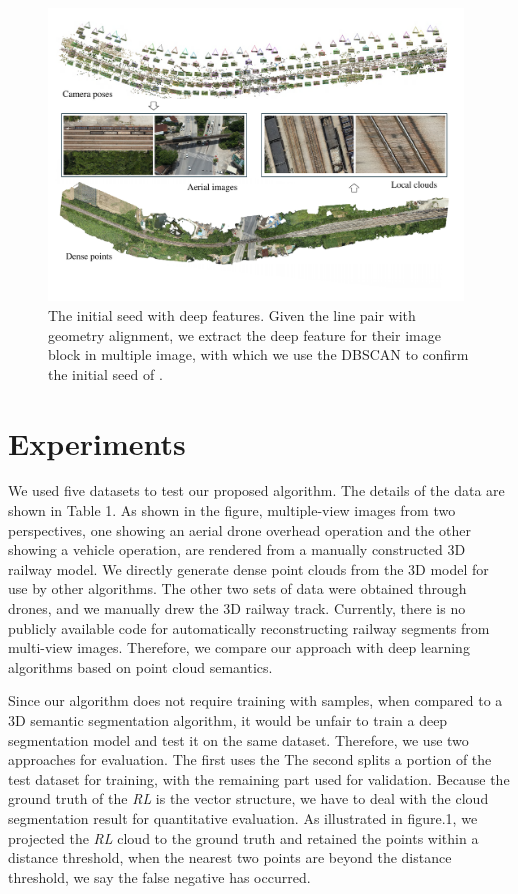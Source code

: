 \begin{figure}[h]
    \centering
    \includegraphics[width=0.98\textwidth]{images/aerial1.pdf}
    \caption{The initial seed with deep features.
    Given the line pair with geometry alignment, 
    we extract the deep feature for their image block in multiple image,
    with which we use the DBSCAN to confirm the initial seed of \rlp.}
    \label{fig_aerial1}
\end{figure}

\section{Experiments}
We used five datasets to test our proposed algorithm.
The details of the data are shown in Table 1.
As shown in the figure, 
multiple-view images from two perspectives, 
one showing an aerial drone overhead operation and the other showing a vehicle operation, 
are rendered from a manually constructed 3D railway model.
We directly generate dense point clouds from the 3D model for use by other algorithms.
The other two sets of data were obtained through drones, 
and we manually drew the 3D railway track.
Currently, 
there is no publicly available code for automatically reconstructing railway segments from multi-view images. Therefore, 
we compare our approach with deep learning algorithms based on point cloud semantics.

Since our algorithm does not require training with samples,  
when compared to a 3D semantic segmentation algorithm,
it would be unfair to train a deep segmentation model and test it on the same dataset. 
Therefore, 
we use two approaches for evaluation. 
The first uses the  
The second splits a portion of the test dataset for training, 
with the remaining part used for validation.
Because the ground truth of the \textit{RL} is the vector structure,
we have to deal with the cloud segmentation result for quantitative evaluation.
As illustrated in figure.1, 
we projected the \textit{RL} cloud to the ground truth and retained the points within a distance threshold,
when the nearest two points are beyond the distance threshold, 
we say the false negative has occurred.

